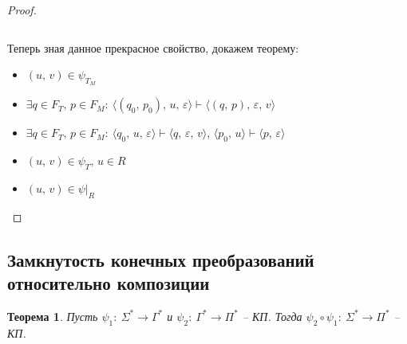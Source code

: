 \documentclass[a4paper,12pt]{article}
\theoremstyle{plain}
\newtheorem{theorem}{Теорема}[subsection]
\theoremstyle{definition}
\theoremstyle{remark}
\begin{document}
\begin{proof}
\begin{itemize}
\begin{itemize}
\[			            \]
		      \end{itemize}
	\end{itemize}
	Теперь зная данное прекрасное свойство, докажем теорему:
	\begin{itemize}
		\item $(u,\,v) \in \psi_{T_M}$
		\item $\exists q \in F_T,\, p \in F_M :\: \langle(q_0,\,p_0),\,u,\,\varepsilon\rangle\vdash\langle(q,\,p),\,\varepsilon,\,v\rangle$
		\item $\exists q \in F_T,\, p \in F_M :\: \langle q_0,\,u,\,\varepsilon\rangle\vdash\langle q,\,\varepsilon,\,v\rangle,\,\langle p_0,\,u\rangle\vdash\langle p,\,\varepsilon\rangle$
		\item $(u,\,v) \in \psi_T,\, u \in R$
		\item $(u,\, v) \in \psi\vert_R$
	\end{itemize}
\end{proof}

\subsection{Замкнутость конечных преобразований относительно композиции}
\begin{theorem}
	Пусть $\psi_1 :\: \Sigma^* \to \Gamma^*$ и $\psi_2 :\: \Gamma^* \to \Pi^*$ -- КП. Тогда $\psi_2\circ\psi_1 :\: \Sigma^* \to \Pi^*$ -- КП.
\end{theorem}
\end{document}
